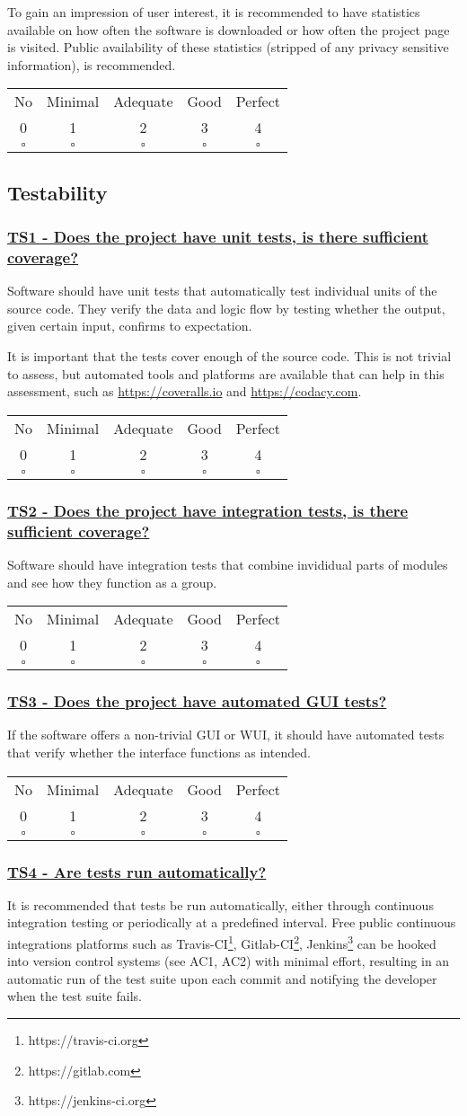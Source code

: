 \documentclass[a4paper,11pt]{article}
\newcommand{\criterion}[2]{\subsubsection*{\underline{#1 - #2}}\label{id:#1}}
\newcommand\CheckTable{%
  \begin{tabular}{ccccc}
    No & Minimal & Adequate & Good & Perfect \\
    0 & 1 & 2 & 3 & 4 \\
    \hline
    $\square$ & $\square$ & $\square$ & $\square$ & $\square$ \\
  \end{tabular}%
}
\begin{document}
To gain an impression of user interest, it is recommended to have statistics
available on how often the software is downloaded or how often the project page
is visited. Public availability of these statistics (stripped of any privacy
sensitive information), is recommended.

\CheckTable

\subsection{Testability}\label{sec:tes}

\newcommand{\tsOneID}{TS1}
\newcommand{\tsOneText}{Does the project have unit tests, is there sufficient coverage?}
\criterion{\tsOneID}{\tsOneText}

Software should have unit tests that automatically test individual units of the
source code. They verify the data and logic flow by testing whether the output,
given certain input, confirms to expectation.

It is important that the tests cover enough of the source code. This is not
trivial to assess, but automated tools
and platforms are available that can help in this assessment, such as
\url{https://coveralls.io} and \url{https://codacy.com}.

\CheckTable

\newcommand{\tsTwoID}{TS2}
\newcommand{\tsTwoText}{Does the project have integration tests, is there sufficient coverage?}
\criterion{\tsTwoID}{\tsTwoText}

Software should have integration tests that combine invididual parts of modules and see how they function
as a group.

\CheckTable

\newcommand{\tsThreeID}{TS3}
\newcommand{\tsThreeText}{Does the project have automated GUI tests?}
\criterion{\tsThreeID}{\tsThreeText}

If the software offers a non-trivial GUI or WUI, it should have automated tests
that verify whether the interface functions as intended.

\CheckTable

\newcommand{\tsFourID}{TS4}
\newcommand{\tsFourText}{Are tests run automatically?}
\criterion{\tsFourID}{\tsFourText}

It is recommended that tests be run automatically, either through continuous
integration testing or periodically at a predefined interval. Free public
continuous integrations platforms such as
Travis-CI\footnote{https://travis-ci.org},
Gitlab-CI\footnote{https://gitlab.com},
Jenkins\footnote{https://jenkins-ci.org} can be hooked into version control
systems (see AC1, AC2) with minimal effort, resulting in an automatic run of the test suite
upon each commit and notifying the developer when the test suite fails.
\end{document}
